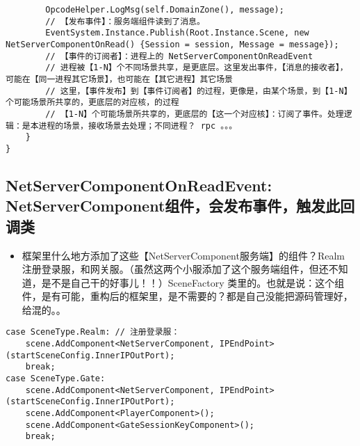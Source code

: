 \documentclass[9pt, b5paper]{article}
\begin{document}
\begin{itemize}
\begin{verbatim}
        OpcodeHelper.LogMsg(self.DomainZone(), message);
        // 【发布事件】：服务端组件读到了消息。
        EventSystem.Instance.Publish(Root.Instance.Scene, new NetServerComponentOnRead() {Session = session, Message = message});
        // 【事件的订阅者】：进程上的 NetServerComponentOnReadEvent
        // 进程被【1-N】个不同场景共享，是更底层。这里发出事件，【消息的接收者】，可能在【同一进程其它场景】，也可能在【其它进程】其它场景
        // 这里，【事件发布】到【事件订阅者】的过程，更像是，由某个场景，到【1-N】个可能场景所共享的，更底层的对应核，的过程
        // 【1-N】个可能场景所共享的，更底层的【这一个对应核】：订阅了事件。处理逻辑：是本进程的场景，接收场景去处理；不同进程？ rpc 。。。
    }
}
\end{verbatim}
\end{itemize}
\subsection{NetServerComponentOnReadEvent: NetServerComponent组件，会发布事件，触发此回调类}
\label{sec-3-5}
\begin{itemize}
\item 框架里什么地方添加了这些【NetServerComponent服务端】的组件？Realm 注册登录服，和网关服。（虽然这两个小服添加了这个服务端组件，但还不知道，是不是自己干的好事儿！！）SceneFactory 类里的。也就是说：这个组件，是有可能，重构后的框架里，是不需要的？都是自己没能把源码管理好，给混的。。
\end{itemize}
\begin{verbatim}
case SceneType.Realm: // 注册登录服：
    scene.AddComponent<NetServerComponent, IPEndPoint>(startSceneConfig.InnerIPOutPort);
    break;
case SceneType.Gate:
    scene.AddComponent<NetServerComponent, IPEndPoint>(startSceneConfig.InnerIPOutPort);
    scene.AddComponent<PlayerComponent>();
    scene.AddComponent<GateSessionKeyComponent>();
    break;
\end{verbatim}
\end{document}

